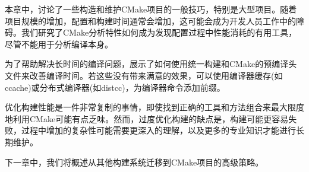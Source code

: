 本章中，讨论了一些构造和维护CMake项目的一般技巧，特别是大型项目。随着项目规模的增加，配置和构建时间通常会增加，这可能会成为开发人员工作中的障碍。我们研究了CMake分析特性如何成为发现配置过程中性能消耗的有用工具，尽管不能用于分析编译本身。

为了帮助解决长时间的编译问题，展示了如何使用统一构建和CMake的预编译头文件来改善编译时间。若这些没有带来满意的效果，可以使用编译器缓存(如ccache)或分布式编译器(如distcc)，为编译器命令添加前缀。

优化构建性能是一件非常复制的事情，即使找到正确的工具和方法组合来最大限度地利用CMake可能有点乏味。然而，过度优化构建的缺点是，构建可能更容易失败，过程中增加的复杂性可能需要更深入的理解，以及更多的专业知识才能进行长期维护。

下一章中，我们将概述从其他构建系统迁移到CMake项目的高级策略。
